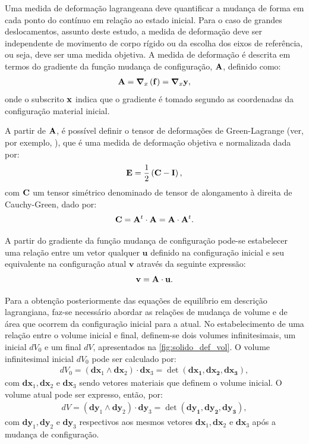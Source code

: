 Uma medida de deformação lagrangeana deve quantificar a mudança de forma em cada ponto do contínuo em relação ao estado inicial. Para o caso de grandes deslocamentos, assunto deste estudo, a medida de deformação deve ser independente de movimento de corpo rígido ou da escolha dos eixos de referência, ou seja, deve ser uma medida objetiva. A medida de deformação é descrita em termos do gradiente da função mudança de configuração, $\mathbf{A}$, definido como:
\begin{align}
	\mathbf{A} = \boldsymbol{\nabla}_x\left(\mathbf{f}\right) = \boldsymbol{\nabla}_x\mathbf{y},
\end{align}
\noindent onde o subscrito $\mathbf{x}$ indica que o gradiente é tomado segundo as coordenadas da configuração material inicial.

A partir de $\mathbf{A}$, é possível definir o tensor de deformações de Green-Lagrange (ver, por exemplo, ), que é uma medida de deformação objetiva e normalizada dada por: 
\begin{align}
	\mathbf{E} = \frac{1}{2}\left(\mathbf{C} - \mathbf{I}\right),
\end{align}
\noindent com $\mathbf{C}$ um tensor simétrico denominado de tensor de alongamento à direita de Cauchy-Green, dado por:
\begin{align}
	\mathbf{C} = \mathbf{A}^{t} \cdot \mathbf{A} =  \mathbf{A} \cdot \mathbf{A}^{t}.
\end{align}

A partir do gradiente da função mudança de configuração pode-se estabelecer uma relação entre um vetor qualquer $\mathbf{u}$ definido na configuração inicial e seu equivalente na configuração atual $\mathbf{v}$ através da seguinte expressão:
\begin{align}
	\mathbf{v} = \mathbf{A} \cdot \mathbf{u} \label{eq:rel_vet}.
\end{align}

Para a obtenção posteriormente das equações de equilíbrio em descrição lagrangiana, faz-se necessário abordar as relações de mudança de volume e de área que ocorrem da configuração inicial para a atual. No estabelecimento de uma relação entre o volume inicial e final, definem-se dois volumes infinitesimais, um inicial $dV_{0}$ e um final $dV$, apresentados na \autoref{fig:solido_def_vol}. O volume infinitesimal inicial $dV_{0}$ pode ser calculado por:
\begin{align}
	dV_{0} = (\mathbf{dx}_{1} \wedge \mathbf{dx}_{2}) \cdot \mathbf{dx}_{3} = \det{(\mathbf{dx_1},\mathbf{dx_2},\mathbf{dx_3})},
\end{align}
\noindent com $\mathbf{dx}_1,\mathbf{dx}_2$ e $\mathbf{dx}_3$ sendo vetores materiais que definem o volume inicial. O volume atual pode ser expresso, então, por:
\begin{align}
	dV = (\mathbf{dy}_{1} \wedge \mathbf{dy}_{2}) \cdot \mathbf{dy}_{3} = \det{(\mathbf{dy_1},\mathbf{dy_2},\mathbf{dy_3})}, \label{eq:vol_atual}
\end{align}
\noindent com $\mathbf{dy}_1,\mathbf{dy}_2$ e $\mathbf{dy}_3$ respectivos aos mesmos vetores $\mathbf{dx}_1,\mathbf{dx}_2$ e $\mathbf{dx}_3$ após a mudança de configuração.

